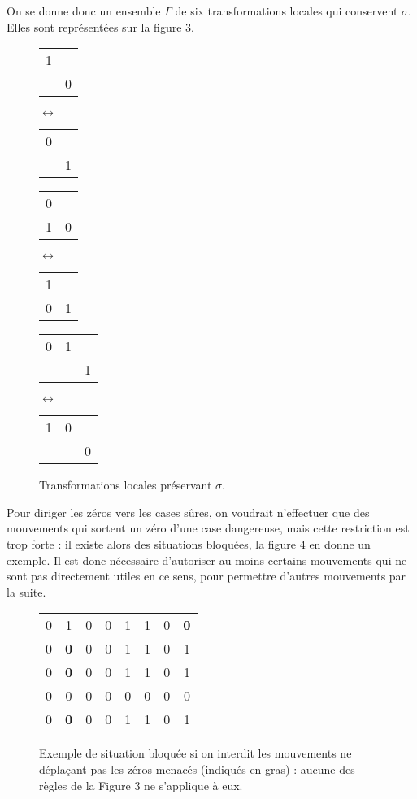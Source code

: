 \documentclass[11pt, openany]{article}
\begin{document}
On se donne donc un ensemble $\Gamma$ de six transformations locales qui conservent $\sigma$. Elles sont représentées sur la figure $3$. 


\begin{figure}
\centering
\begin{tabular}{cc}
1& \\
 &0\\
\end{tabular}
$\longleftrightarrow$
\begin{tabular}{cc}
0& \\
 &1\\
\end{tabular}

\bigskip

\begin{tabular}{cc}
0& \\
1&0\\
\end{tabular}
$\longleftrightarrow$
\begin{tabular}{cc}
1& \\
0&1\\
\end{tabular}

\bigskip

\begin{tabular}{ccc}
0&1&\\
&&1\\
\end{tabular}
$\longleftrightarrow$
\begin{tabular}{ccc}
1&0&\\
&&0\\
\end{tabular}
\caption{Transformations locales préservant $\sigma$.}
\end{figure}

Pour diriger les zéros vers les cases sûres, on voudrait n'effectuer que des mouvements qui sortent un zéro d'une case dangereuse, mais cette restriction est trop forte : il existe alors des situations bloquées, la figure $4$ en donne un exemple. Il est donc nécessaire d'autoriser au moins certains mouvements qui ne sont pas directement utiles en ce sens, pour permettre d'autres mouvements par la suite.

\begin{figure}
\centering
\begin{tabular}{cccccccc}
0&1&0&0&1&1&0&\textbf 0\\
0&\textbf 0&0&0&1&1&0&1\\
0&\textbf 0&0&0&1&1&0&1\\
0&0&0&0&0&0&0&0\\
0&\textbf 0&0&0&1&1&0&1\\
\end{tabular}


\caption{Exemple de situation bloquée si on interdit les mouvements ne déplaçant pas les zéros menacés (indiqués en gras) : aucune des règles de la Figure $3$ ne s'applique à eux.}

\end{figure}
\end{document}
